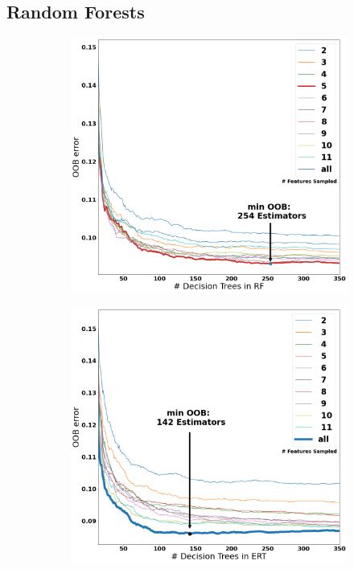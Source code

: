 \documentclass[a4paper, twoside, final, 12pt]{article}
\begin{document}
{\subsection{Random Forests}

\begin{figure}[h]
	\begin{subfigure}{0.48\linewidth}
		\centering
		\includegraphics[scale=0.2]{./src/RF_oob_error}
	\end{subfigure}
	\begin{subfigure}{0.5\linewidth}
		\centering
		\includegraphics[scale=0.2]{./src/ERT_oob_error}

\end{subfigure}
\end{figure}}
\end{document}
